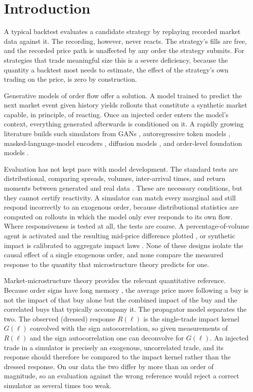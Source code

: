 \documentclass[11pt]{article}
\newcommand{\Rl}{R(\ell)}
\newcommand{\Gl}{G(\ell)}
\begin{document}
\section{Introduction}

A typical backtest evaluates a candidate strategy by replaying recorded market data against it. The recording, however, never reacts. The strategy's fills are free, and the recorded price path is unaffected by any order the strategy submits. For strategies that trade meaningful size this is a severe deficiency, because the quantity a backtest most needs to estimate, the effect of the strategy's own trading on the price, is zero by construction.

Generative models of order flow offer a solution. A model trained to predict the next market event given history yields rollouts that constitute a synthetic market capable, in principle, of reacting. Once an injected order enters the model's context, everything generated afterwards is conditioned on it. A rapidly growing literature builds such simulators from GANs \citep{coletta2021,coletta2022}, autoregressive token models \citep{nagy2023}, masked-language-model encoders \citep{lobert2025}, diffusion models \citep{trades2025,difflob2026}, and order-level foundation models \citep{mars2025}.

Evaluation has not kept pace with model development. The standard tests are distributional, comparing spreads, volumes, inter-arrival times, and return moments between generated and real data \citep{cont2001,lobbench2025}. These are necessary conditions, but they cannot certify reactivity. A simulator can match every marginal and still respond incorrectly to an exogenous order, because distributional statistics are computed on rollouts in which the model only ever responds to its own flow. Where responsiveness is tested at all, the tests are coarse. A percentage-of-volume agent is activated and the resulting mid-price difference plotted \citep{coletta2022,trades2025}, or synthetic impact is calibrated to aggregate impact laws \citep{mars2025,noble2026}. None of these designs isolate the causal effect of a single exogenous order, and none compare the measured response to the quantity that microstructure theory predicts for one.

Market-microstructure theory provides the relevant quantitative reference. Because order signs have long memory \citep{lillofarmer2004}, the average price move following a buy is not the impact of that buy alone but the combined impact of the buy and the correlated buys that typically accompany it. The propagator model \citep{bouchaud2004,taranto2016} separates the two. The observed (dressed) response $\Rl$ is the single-trade impact kernel $\Gl$ convolved with the sign autocorrelation, so given measurements of $\Rl$ and the sign autocorrelation one can deconvolve for $\Gl$. An injected trade in a simulator is precisely an exogenous, uncorrelated trade, and its response should therefore be compared to the impact kernel rather than the dressed response. On our data the two differ by more than an order of magnitude, so an evaluation against the wrong reference would reject a correct simulator as several times too weak.
\end{document}
